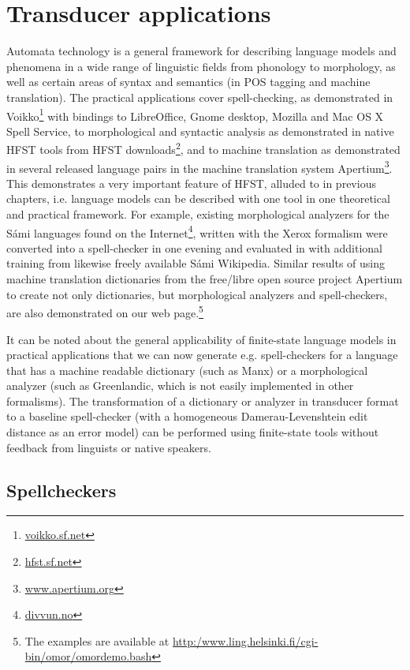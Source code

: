 \documentclass[draft]{llncs}
\begin{document}
\section{Transducer applications}\label{Applications}



Automata technology is a general framework for describing language models
and phenomena in a wide range of linguistic fields from phonology to
morphology, as well as certain areas of syntax and semantics (in POS tagging and
machine translation).  The practical applications cover spell-checking, 
as demonstrated in Voikko\footnote{\url{voikko.sf.net}} with
bindings to LibreOffice, Gnome desktop, Mozilla and Mac OS X Spell Service, to
morphological and syntactic analysis as demonstrated in native HFST tools
from HFST downloads\footnote{\url{hfst.sf.net}}, and to machine translation as demonstrated in
several released language pairs in the machine translation system
Apertium\footnote{\url{www.apertium.org}}. This demonstrates a very important feature of HFST,
alluded to in previous chapters, i.e. language models can be
described with one tool in one theoretical and practical framework. For example,
existing morphological analyzers for the Sámi languages found on the
Internet\footnote{\url{divvun.no}}, written with the Xerox formalism were converted into a spell-checker 
in one evening and evaluated in \cite{pirinen/2010/lrec} with additional training from likewise freely
available Sámi Wikipedia. Similar results of using machine translation
dictionaries from the free/libre open source project
Apertium to create not only
dictionaries, but morphological analyzers and spell-checkers, are also
demonstrated on our web page.\footnote{The examples are available at
  \url{http:/www.ling.helsinki.fi/cgi-bin/omor/omordemo.bash}}

It can be noted about the general applicability of finite-state
language models in practical applications that we can now generate
e.g. spell-checkers for a language that has a machine
readable dictionary (such as Manx) or a morphological analyzer (such as
Greenlandic, which is not easily implemented in other formalisms). 
The transformation of a dictionary or analyzer in transducer format 
to a baseline spell-checker (with a homogeneous 
Damerau-Levenshtein edit distance as an error model) can be performed using finite-state tools 
without  feedback from linguists or native speakers.

\subsection{Spellcheckers}
\end{document}
